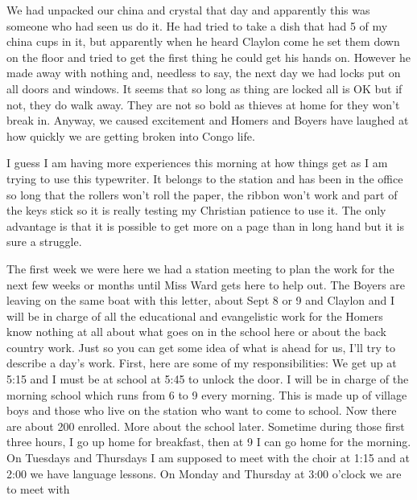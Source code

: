 \documentclass[
]{book}
\begin{document}
We had unpacked our china and crystal that day and apparently this was someone who had seen us do it. He had tried to take a dish that had 5 of my china cups in it, but apparently when he heard Claylon come he set them down on the floor and tried to get the first thing he could get his hands on. However he made away with nothing and, needless to say, the next day we had locks put on all doors and windows. It seems that so long as thing are locked all is OK but if not, they do walk away. They are not so bold as thieves at home for they won't break in. Anyway, we caused excitement and Homers and Boyers have laughed at how quickly we are getting broken into Congo life.

I guess I am having more experiences this morning at how things get as I am trying to use this typewriter. It belongs to the station and has been in the office so long that the rollers won't roll the paper, the ribbon won't work and part of the keys stick so it is really testing my Christian patience to use it. The only advantage is that it is possible to get more on a page than in long hand but it is sure a struggle.

The first week we were here we had a station meeting to plan the work for the next few weeks or months until Miss Ward gets here to help out. The Boyers are leaving on the same boat with this letter, about Sept 8 or 9 and Claylon and I will be in charge of all the educational and evangelistic work for the Homers know nothing at all about what goes on in the school here or about the back country work. Just so you can get some idea of what is ahead for us, I'll try to describe a day's work. First, here are some of my responsibilities: We get up at 5:15 and I must be at school at 5:45 to unlock the door. I will be in charge of the morning school which runs from 6 to 9 every morning. This is made up of village boys and those who live on the station who want to come to school. Now there are about 200 enrolled. More about the school later. Sometime during those first three hours, I go up home for breakfast, then at 9 I can go home for the morning. On Tuesdays and Thursdays I am supposed to meet with the choir at 1:15 and at 2:00 we have language lessons. On Monday and Thursday at 3:00 o'clock we are to meet with
\end{document}
